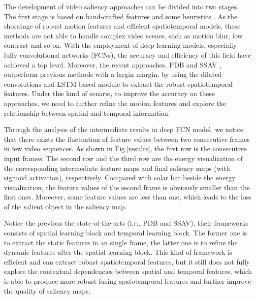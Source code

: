 \documentclass[12pt]{article}
\begin{document}
The development of video saliency approaches can be divided into two stages. The first stage is based on hand-crafted features and some heuristics \cite{xxx}. As the shoratage of robust motion features and efficient spatiotemporal models, these methods are not able to handle complex video scenes, such as motion blur, low contrast and so on. With the employment of deep learning models, especially fully convolutional networks (FCNs)\cite{xxx}, the accuracy and efficiency of this field have achieved a top level. Moreover, the recent approaches, PDB \cite{xxx} and SSAV \cite{xxx}, outperform previous methods with a largin margin, by using the dilated convolutions and LSTM-based module to extract the robust spatiotemporal features. Under this kind of senario, to improve the accuracy on these approaches, we need to further refine the motion features and explore the relationship between spatial and temporal information.

Through the analysis of the intermediate results in deep FCN model, we notice that there exists the fluctuation of feature values between two consecutive frames in few video sequences. As shown in Fig.\ref{results}, the first row is the consecutive input frames. The second row and the third row are the energy visualization of the corresponding intermediate feature maps and final saliency maps (with sigmoid activation), respectively. Compared with colar bar beside the energy visualization, the feature values of the second frame is obviously smaller than the first ones. Moreover, some feature values are less than one, which leads to the loss of the salient object in the saliency map.  

Notice the previous the state-of-the-arts (i.e., PDB and SSAV), their frameworks consists of spatial learning block and temporal learning block. The former one is to extract the static features in an single frame, the latter one is to refine the dynamic features after the spatial learning block. This kind of framework is efficient and can extract robust spatiotemporal features, but it still does not fully explore the contextual dependencies between spatial and temporal features, which is able to produce more robust fusing spatotemporal features and further improve the quality of saliency maps.
\end{document}
